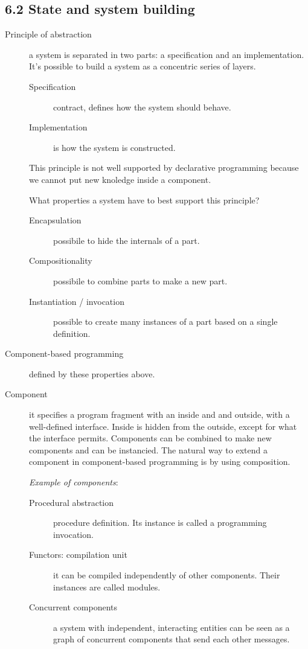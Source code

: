 \subsection{6.2 State and system building}
\begin{description}
  \item[Principle of abstraction] a system is separated in two parts: a specification and an implementation.
    It's possible to build a system as a concentric series of layers.
    \begin{description}
      \item[Specification] contract, defines how the system should behave.
      \item[Implementation] is how the system is constructed.
    \end{description}
    This principle is not well supported by declarative programming because we cannot put new knoledge inside a component.

    What properties a system have to best support this principle?
    \begin{description}
      \item[Encapsulation] possibile to hide the internals of a part.
      \item[Compositionality] possibile to combine parts to make a new part.
      \item[Instantiation / invocation] possible to create many instances of a part based on a single definition.
    \end{description}
  \item[Component-based programming] defined by these properties above.
  \item[Component] it specifies a program fragment with an inside and and outside, with a well-defined interface.
    Inside is hidden from the outside, except for what the interface permits.
    Components can be combined to make new components and can be instancied.
    The natural way to extend a component in component-based programming is by using composition.

    \emph{Example of components}:
    \begin{description}
      \item[Procedural abstraction] procedure definition.
        Its instance is called a programming invocation.
      \item[Functors: compilation unit] it can be compiled independently of other components.
        Their instances are called modules.
      \item[Concurrent components] a system with independent, interacting entities can be seen as a graph of concurrent components that send each other messages.
    \end{description}


\end{description}
